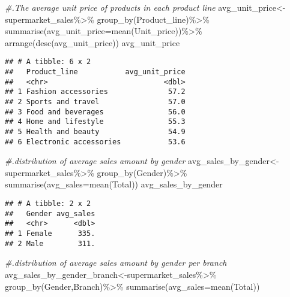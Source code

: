 \documentclass[
]{article}
\newenvironment{Shaded}{\begin{snugshade}}{\end{snugshade}}
\newcommand{\AttributeTok}[1]{\textcolor[rgb]{0.77,0.63,0.00}{#1}}
\newcommand{\CommentTok}[1]{\textcolor[rgb]{0.56,0.35,0.01}{\textit{#1}}}
\newcommand{\FunctionTok}[1]{\textcolor[rgb]{0.00,0.00,0.00}{#1}}
\newcommand{\NormalTok}[1]{#1}
\newcommand{\OtherTok}[1]{\textcolor[rgb]{0.56,0.35,0.01}{#1}}
\newcommand{\SpecialCharTok}[1]{\textcolor[rgb]{0.00,0.00,0.00}{#1}}
\begin{document}
\begin{Shaded}
\begin{Highlighting}[]
\CommentTok{\#.The average unit price of products in each product line}
\NormalTok{avg\_unit\_price}\OtherTok{\textless{}{-}}\NormalTok{supermarket\_sales}\SpecialCharTok{\%\textgreater{}\%}
  \FunctionTok{group\_by}\NormalTok{(Product\_line)}\SpecialCharTok{\%\textgreater{}\%}
  \FunctionTok{summarise}\NormalTok{(}\AttributeTok{avg\_unit\_price=}\FunctionTok{mean}\NormalTok{(Unit\_price))}\SpecialCharTok{\%\textgreater{}\%}
  \FunctionTok{arrange}\NormalTok{(}\FunctionTok{desc}\NormalTok{(avg\_unit\_price))}
\NormalTok{avg\_unit\_price}
\end{Highlighting}
\end{Shaded}

\begin{verbatim}
## # A tibble: 6 x 2
##   Product_line           avg_unit_price
##   <chr>                           <dbl>
## 1 Fashion accessories              57.2
## 2 Sports and travel                57.0
## 3 Food and beverages               56.0
## 4 Home and lifestyle               55.3
## 5 Health and beauty                54.9
## 6 Electronic accessories           53.6
\end{verbatim}

\begin{Shaded}
\begin{Highlighting}[]
\CommentTok{\#.distribution of average sales amount by gender}
\NormalTok{avg\_sales\_by\_gender}\OtherTok{\textless{}{-}}\NormalTok{supermarket\_sales}\SpecialCharTok{\%\textgreater{}\%}
  \FunctionTok{group\_by}\NormalTok{(Gender)}\SpecialCharTok{\%\textgreater{}\%}
  \FunctionTok{summarise}\NormalTok{(}\AttributeTok{avg\_sales=}\FunctionTok{mean}\NormalTok{(Total))}
\NormalTok{avg\_sales\_by\_gender}
\end{Highlighting}
\end{Shaded}

\begin{verbatim}
## # A tibble: 2 x 2
##   Gender avg_sales
##   <chr>      <dbl>
## 1 Female      335.
## 2 Male        311.
\end{verbatim}

\begin{Shaded}
\begin{Highlighting}[]
\CommentTok{\#.distribution of average sales amount by gender per branch}
\NormalTok{avg\_sales\_by\_gender\_branch}\OtherTok{\textless{}{-}}\NormalTok{supermarket\_sales}\SpecialCharTok{\%\textgreater{}\%}
  \FunctionTok{group\_by}\NormalTok{(Gender,Branch)}\SpecialCharTok{\%\textgreater{}\%}
  \FunctionTok{summarise}\NormalTok{(}\AttributeTok{avg\_sales=}\FunctionTok{mean}\NormalTok{(Total))}
\end{Highlighting}
\end{Shaded}
\end{document}
